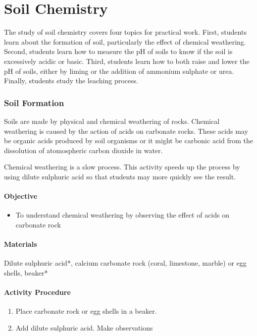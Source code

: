 \chapter{Soil Chemistry}

The study of soil chemistry covers four topics for practical work. First, students learn about the formation of soil, particularly the effect of chemical weathering. Second, students learn how to measure the pH of soils to know if the soil is excessively acidic or basic. Third, students learn how to both raise and lower the pH of soils, either by liming or the addition of ammonium sulphate or urea. Finally, students study the leaching process.

\subsection{Soil Formation}

Soils are made by physical and chemical weathering of rocks. Chemical weathering is caused by the action of acids on carbonate rocks. These acids may be organic acids produced by soil organisms or it might be carbonic acid from the dissolution of atomospheric carbon dioxide in water.

Chemical weathering is a slow process. This activity speeds up the process by using dilute sulphuric acid so that students may more quickly see the result.

\subsubsection{Objective}
\begin{itemize}
\item{To understand chemical weathering by observing the effect of acids on carbonate rock}
\end{itemize}

\subsubsection{Materials}
Dilute sulphuric acid*, calcium carbonate rock (coral, limestone, marble) or egg shells, beaker*

\subsubsection{Activity Procedure}
\begin{enumerate}
\item{Place carbonate rock or egg shells in a beaker.}
\item{Add dilute sulphuric acid. Make observations}
\end{enumerate}

